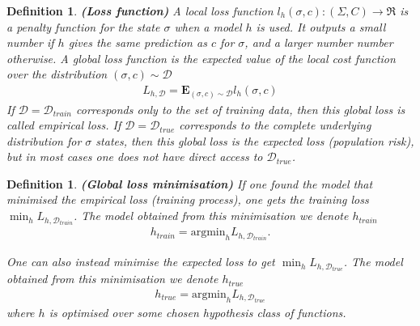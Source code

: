 \documentclass[onecolumn,prx, superscriptaddress,longbibliography,margin=1mm 11pt]{revtex4-2}
\newtheorem{definition}[theorem]{Definition}
\begin{document}
\begin{definition} \textbf{(Loss function)} A \textit{local loss function} $l_h(\sigma, c): (\Sigma, C) \rightarrow \Re$ is a penalty function for the state $\sigma$ when a model $h$ is used. It outputs a small number if $h$ gives the same prediction as $c$ for $\sigma$, and a larger number number otherwise. A \textit{global loss function} is the expected value of the local cost function over the distribution $(\sigma, c) \sim \mathcal{D}$
\begin{align}
    L_{h, \mathcal{D}}=\textbf{E}_{(\sigma, c) \sim \mathcal{D}} l_h(\sigma, c)
\end{align}
If $\mathcal{D}=\mathcal{D}_{train}$ corresponds only to the set of training data, then this global loss is called \textit{empirical loss}. If $\mathcal{D}=\mathcal{D}_{true}$ corresponds to the complete underlying distribution for $\sigma$ states, then this global loss is the \textit{expected loss} (population risk), but in most cases one does not have direct access to $\mathcal{D}_{true}$. 
\end{definition}

\begin{definition} \textbf{(Global loss minimisation)} If one found the model that minimised the empirical loss (training process), one gets the \textit{training loss} $\min_h L_{h, \mathcal{D}_{train}}$. The model obtained from this minimisation we denote $h_{train}$
\begin{align}
    h_{train}=\text{argmin}_h L_{h, \mathcal{D}_{train}}. 
\end{align}

One can also instead minimise the expected loss to get $\min_h L_{h, \mathcal{D}_{true}}$. The model obtained from this minimisation we denote $h_{true}$
\begin{align}
    h_{true}=\text{argmin}_h L_{h, \mathcal{D}_{true}}
\end{align}
where $h$ is optimised over some chosen hypothesis class of functions.
\end{definition}
\end{document}
